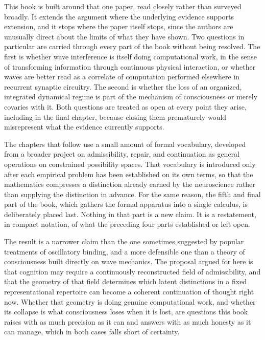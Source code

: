 \documentclass[11pt]{book}
\begin{document}
This book is built around that one paper, read closely rather than surveyed broadly. It extends the argument where the underlying evidence supports extension, and it stops where the paper itself stops, since the authors are unusually direct about the limits of what they have shown. Two questions in particular are carried through every part of the book without being resolved. The first is whether wave interference is itself doing computational work, in the sense of transforming information through continuous physical interaction, or whether waves are better read as a correlate of computation performed elsewhere in recurrent synaptic circuitry. The second is whether the loss of an organized, integrated dynamical regime is part of the mechanism of consciousness or merely covaries with it. Both questions are treated as open at every point they arise, including in the final chapter, because closing them prematurely would misrepresent what the evidence currently supports.

The chapters that follow use a small amount of formal vocabulary, developed from a broader project on admissibility, repair, and continuation as general operations on constrained possibility spaces. That vocabulary is introduced only after each empirical problem has been established on its own terms, so that the mathematics compresses a distinction already earned by the neuroscience rather than supplying the distinction in advance. For the same reason, the fifth and final part of the book, which gathers the formal apparatus into a single calculus, is deliberately placed last. Nothing in that part is a new claim. It is a restatement, in compact notation, of what the preceding four parts established or left open.

The result is a narrower claim than the one sometimes suggested by popular treatments of oscillatory binding, and a more defensible one than a theory of consciousness built directly on wave mechanics. The proposal argued for here is that cognition may require a continuously reconstructed field of admissibility, and that the geometry of that field determines which latent distinctions in a fixed representational repertoire can become a coherent continuation of thought right now. Whether that geometry is doing genuine computational work, and whether its collapse is what consciousness loses when it is lost, are questions this book raises with as much precision as it can and answers with as much honesty as it can manage, which in both cases falls short of certainty.

\end{document}
